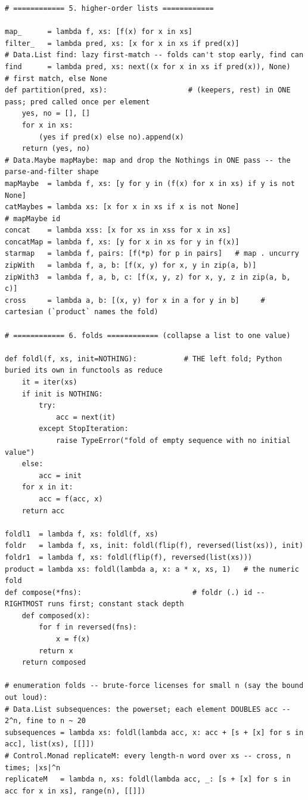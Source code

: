 \documentclass[10pt,letterpaper]{book}
\begin{document}
\begin{lstlisting}[style=file]
# ============ 5. higher-order lists ============

map_      = lambda f, xs: [f(x) for x in xs]
filter_   = lambda pred, xs: [x for x in xs if pred(x)]
# Data.List find: lazy first-match -- folds can't stop early, find can
find      = lambda pred, xs: next((x for x in xs if pred(x)), None)   # first match, else None
def partition(pred, xs):                   # (keepers, rest) in ONE pass; pred called once per element
    yes, no = [], []
    for x in xs:
        (yes if pred(x) else no).append(x)
    return (yes, no)
# Data.Maybe mapMaybe: map and drop the Nothings in ONE pass -- the parse-and-filter shape
mapMaybe  = lambda f, xs: [y for y in (f(x) for x in xs) if y is not None]
catMaybes = lambda xs: [x for x in xs if x is not None]                      # mapMaybe id
concat    = lambda xss: [x for xs in xss for x in xs]
concatMap = lambda f, xs: [y for x in xs for y in f(x)]
starmap   = lambda f, pairs: [f(*p) for p in pairs]   # map . uncurry
zipWith   = lambda f, a, b: [f(x, y) for x, y in zip(a, b)]
zipWith3  = lambda f, a, b, c: [f(x, y, z) for x, y, z in zip(a, b, c)]
cross     = lambda a, b: [(x, y) for x in a for y in b]     # cartesian (`product` names the fold)

# ============ 6. folds ============ (collapse a list to one value)

def foldl(f, xs, init=NOTHING):           # THE left fold; Python buried its own in functools as reduce
    it = iter(xs)
    if init is NOTHING:
        try:
            acc = next(it)
        except StopIteration:
            raise TypeError("fold of empty sequence with no initial value")
    else:
        acc = init
    for x in it:
        acc = f(acc, x)
    return acc

foldl1  = lambda f, xs: foldl(f, xs)
foldr   = lambda f, xs, init: foldl(flip(f), reversed(list(xs)), init)
foldr1  = lambda f, xs: foldl(flip(f), reversed(list(xs)))
product = lambda xs: foldl(lambda a, x: a * x, xs, 1)   # the numeric fold
def compose(*fns):                          # foldr (.) id -- RIGHTMOST runs first; constant stack depth
    def composed(x):
        for f in reversed(fns):
            x = f(x)
        return x
    return composed

# enumeration folds -- brute-force licenses for small n (say the bound out loud):
# Data.List subsequences: the powerset; each element DOUBLES acc -- 2^n, fine to n ~ 20
subsequences = lambda xs: foldl(lambda acc, x: acc + [s + [x] for s in acc], list(xs), [[]])
# Control.Monad replicateM: every length-n word over xs -- cross, n times; |xs|^n
replicateM   = lambda n, xs: foldl(lambda acc, _: [s + [x] for s in acc for x in xs], range(n), [[]])


\end{lstlisting}
\end{document}
